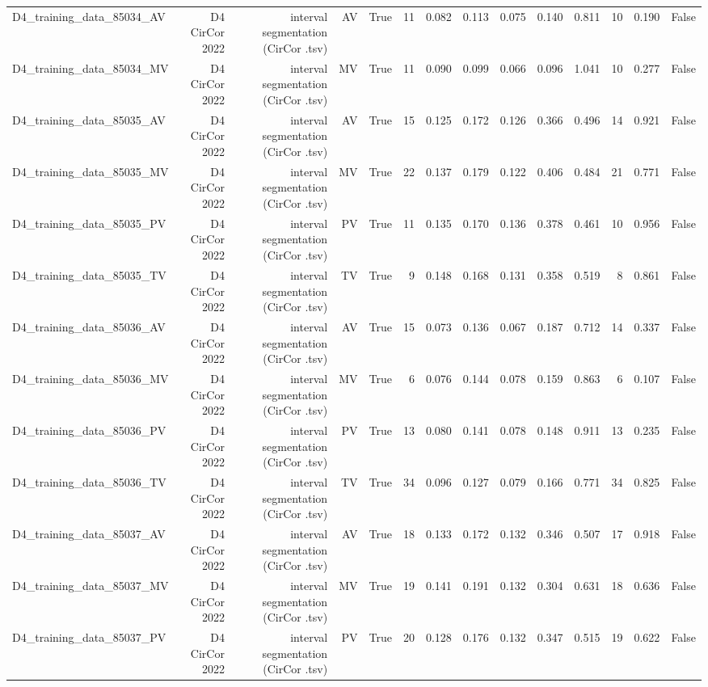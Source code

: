 \begin{table}[htbp]
\begin{tabular}{lrrrrrrrrrrrrr}
    D4\_training\_data\_85034\_AV & D4 CirCor 2022 & interval segmentation (CirCor .tsv) & AV & True & 11 & 0.082 & 0.113 & 0.075 & 0.140 & 0.811 & 10 & 0.190 & False \\
    D4\_training\_data\_85034\_MV & D4 CirCor 2022 & interval segmentation (CirCor .tsv) & MV & True & 11 & 0.090 & 0.099 & 0.066 & 0.096 & 1.041 & 10 & 0.277 & False \\
    D4\_training\_data\_85035\_AV & D4 CirCor 2022 & interval segmentation (CirCor .tsv) & AV & True & 15 & 0.125 & 0.172 & 0.126 & 0.366 & 0.496 & 14 & 0.921 & False \\
    D4\_training\_data\_85035\_MV & D4 CirCor 2022 & interval segmentation (CirCor .tsv) & MV & True & 22 & 0.137 & 0.179 & 0.122 & 0.406 & 0.484 & 21 & 0.771 & False \\
    D4\_training\_data\_85035\_PV & D4 CirCor 2022 & interval segmentation (CirCor .tsv) & PV & True & 11 & 0.135 & 0.170 & 0.136 & 0.378 & 0.461 & 10 & 0.956 & False \\
    D4\_training\_data\_85035\_TV & D4 CirCor 2022 & interval segmentation (CirCor .tsv) & TV & True & 9 & 0.148 & 0.168 & 0.131 & 0.358 & 0.519 & 8 & 0.861 & False \\
    D4\_training\_data\_85036\_AV & D4 CirCor 2022 & interval segmentation (CirCor .tsv) & AV & True & 15 & 0.073 & 0.136 & 0.067 & 0.187 & 0.712 & 14 & 0.337 & False \\
    D4\_training\_data\_85036\_MV & D4 CirCor 2022 & interval segmentation (CirCor .tsv) & MV & True & 6 & 0.076 & 0.144 & 0.078 & 0.159 & 0.863 & 6 & 0.107 & False \\
    D4\_training\_data\_85036\_PV & D4 CirCor 2022 & interval segmentation (CirCor .tsv) & PV & True & 13 & 0.080 & 0.141 & 0.078 & 0.148 & 0.911 & 13 & 0.235 & False \\
    D4\_training\_data\_85036\_TV & D4 CirCor 2022 & interval segmentation (CirCor .tsv) & TV & True & 34 & 0.096 & 0.127 & 0.079 & 0.166 & 0.771 & 34 & 0.825 & False \\
    D4\_training\_data\_85037\_AV & D4 CirCor 2022 & interval segmentation (CirCor .tsv) & AV & True & 18 & 0.133 & 0.172 & 0.132 & 0.346 & 0.507 & 17 & 0.918 & False \\
    D4\_training\_data\_85037\_MV & D4 CirCor 2022 & interval segmentation (CirCor .tsv) & MV & True & 19 & 0.141 & 0.191 & 0.132 & 0.304 & 0.631 & 18 & 0.636 & False \\
    D4\_training\_data\_85037\_PV & D4 CirCor 2022 & interval segmentation (CirCor .tsv) & PV & True & 20 & 0.128 & 0.176 & 0.132 & 0.347 & 0.515 & 19 & 0.622 & False \\

\end{tabular}
\end{table}

